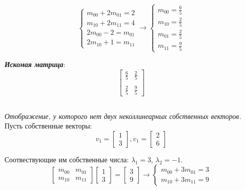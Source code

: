 \documentclass[a5paper, 10pt]{article}
\theoremstyle{definition}
\theoremstyle{plain}
\theoremstyle{remark}
\begin{document}
\begin{equation}
\begin{cases}
m_{0 0} + 2m_{0 1} = 2\\
m_{1 0} + 2m_{1 1} = 4\\
2 m_{0 0} - 2 =  m_{0 1}\\
2m_{1 0} + 1 = m_{1 1} 
\end{cases}
\to
\begin{cases}
m_{0 0} = \frac{6}{5}\\
m_{1 0}  = \frac{2}{5}\\
m_{0 1} = \frac{2}{5} \\
m_{1 1} = \frac{9}{5}
\end{cases}
\end{equation}

\textit{\textbf{Искомая матрица}}:
\begin{equation}
\begin{bmatrix}
 \frac{6}{5} & \frac{2}{5}\\
\\
\frac{2}{5} &  \frac{9}{5}
\end{bmatrix}
\end{equation}

\subsection{}
\textit{Отображение, у которого нет двух неколлинеарных собственных векторов.}\\
Пусть собственные векторы:
\begin{equation}
v_1 = 
\begin{bmatrix}
1\\
3
\end{bmatrix}
,
v_1 = 
\begin{bmatrix}
2\\
6
\end{bmatrix}
\end{equation}

Соотвествующие им собственные числа: $\lambda_1 = 3$, $\lambda_2 = -1$.
\begin{equation}
\begin{bmatrix}
m_{0 0} & m_{0 1}\\
m_{1 0} & m_{1 1}
\end{bmatrix}
\begin{bmatrix}
1\\
3
\end{bmatrix}
=
\begin{bmatrix}
3\\
9
\end{bmatrix}
\to
\begin{cases}
m_{0 0} + 3m_{0 1} = 3\\
m_{1 0} + 3m_{1 1} = 9
\end{cases}
\end{equation}
\end{document}
